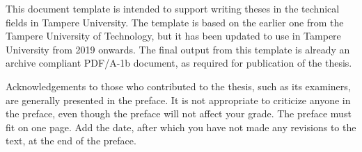 This document template is intended to support writing theses in the technical
fields in Tampere University. The template is based on the earlier one from
the Tampere University of Technology, but it has been updated to use in Tampere
University from 2019 onwards. The final output from this template is already an
archive compliant PDF/A-1b document, as required for publication of the thesis.

Acknowledgements to those who contributed to the thesis, such as its examiners,
are generally presented in the preface. It is not appropriate to criticize
anyone in the preface, even though the preface will not affect your grade. The
preface must fit on one page. Add the date, after which you have not made any
revisions to the text, at the end of the preface.
